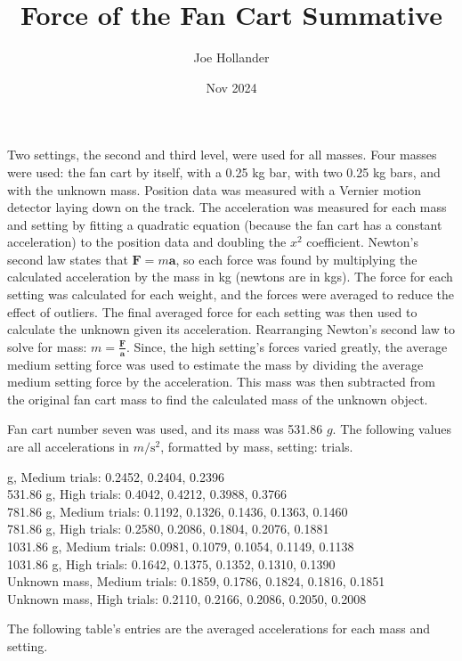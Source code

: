 \documentclass{article}
\title{Force of the Fan Cart Summative}
\author{Joe Hollander}
\date{Nov 2024}
\newcommand{\mps}{$\si{m\per\second^2}$}
\begin{document}
\maketitle 


Two settings, the second and third level, were used for all masses. Four masses were used:
the fan cart by itself, with a 0.25 kg bar, with two 0.25 kg bars,
and with the unknown mass. 
Position data was measured with a Vernier motion detector laying down on the track. 
The acceleration was measured for each mass and setting by fitting a quadratic equation
(because the fan cart has a constant acceleration)
to the position data and doubling the $x^2$ coefficient. 
Newton's second law states that $\mathbf{F} = m \mathbf{a}$, so each force was found by multiplying
the calculated acceleration by the mass in kg (newtons are in kgs). 
The force for each setting was calculated for each weight, and the forces were averaged to 
reduce the effect of outliers. 
The final averaged force for each setting was then used to calculate the unknown given its acceleration.
Rearranging Newton's second law to solve for mass: $m = \mathbf{\frac{F}{a}}$. 
Since, the high setting's forces varied greatly, the average medium setting force was used to estimate the mass by
dividing the average medium setting force by the acceleration. 
This mass was then subtracted from the original fan cart mass to find the calculated mass of the unknown object.

Fan cart number seven was used, and its mass was 531.86 $\si{g}$. 
The following values are all accelerations in \mps, formatted by mass, setting: trials.

\medskip

 g, Medium trials: 0.2452, 0.2404, 0.2396 \\
531.86 g, High trials: 0.4042, 0.4212, 0.3988, 0.3766 \\
781.86 g, Medium trials: 0.1192, 0.1326, 0.1436, 0.1363, 0.1460 \\
781.86 g, High trials: 0.2580, 0.2086, 0.1804, 0.2076, 0.1881 \\
1031.86 g, Medium trials: 0.0981, 0.1079, 0.1054, 0.1149, 0.1138 \\
1031.86 g, High trials: 0.1642, 0.1375, 0.1352, 0.1310, 0.1390 \\
Unknown mass, Medium trials: 0.1859, 0.1786, 0.1824, 0.1816, 0.1851 \\
Unknown mass, High trials: 0.2110, 0.2166, 0.2086, 0.2050, 0.2008
\medskip

The following table's entries are the averaged accelerations for each mass and setting. 
\end{document}
